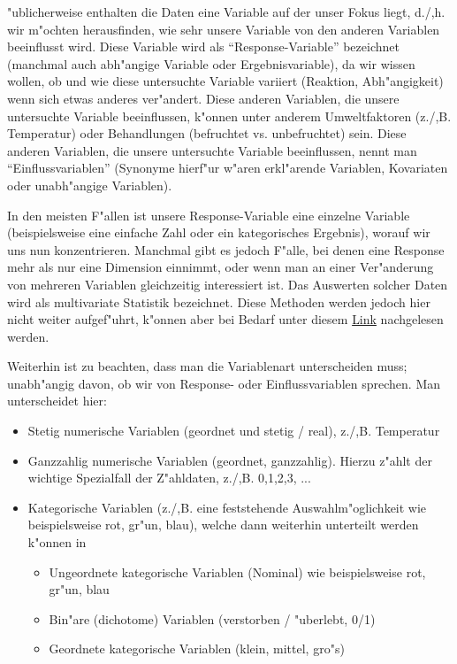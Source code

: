 \documentclass[a4paper,twoside]{tufte-book}\usepackage[]{graphicx}\usepackage[]{color}
\begin{document}
	"ublicherweise enthalten die Daten eine Variable auf der unser Fokus liegt, d./,h. wir m"ochten herausfinden, wie sehr unsere Variable von den anderen Variablen beeinflusst wird.   Diese Variable wird als ``Response-Variable'' bezeichnet (manchmal auch abh"angige Variable oder Ergebnisvariable), da wir wissen wollen, ob und wie diese untersuchte Variable variiert (Reaktion, Abh"angigkeit) wenn sich etwas anderes ver"andert. Diese anderen Variablen, die unsere untersuchte Variable beeinflussen, k"onnen unter anderem Umweltfaktoren (z./,B. Temperatur) oder Behandlungen (befruchtet vs. unbefruchtet) sein.  Diese anderen Variablen, die unsere untersuchte Variable beeinflussen, nennt man ``Einflussvariablen'' (Synonyme hierf"ur w"aren erkl"arende Variablen, Kovariaten oder unabh"angige Variablen). 
	
	In den  meisten F"allen ist unsere Response-Variable eine einzelne Variable (beispielsweise eine einfache Zahl oder ein kategorisches Ergebnis), worauf wir uns nun konzentrieren. Manchmal gibt es jedoch F"alle, bei denen eine Response mehr als nur eine Dimension einnimmt, oder wenn man an einer Ver"anderung von mehreren Variablen gleichzeitig interessiert ist. Das Auswerten solcher Daten wird als multivariate Statistik bezeichnet. Diese Methoden werden jedoch hier nicht weiter aufgef"uhrt, k"onnen aber bei Bedarf unter diesem \href{http://biometry.github.io/APES/Stats/stats50-MultivariateStatistics.html}{Link} nachgelesen werden.
	
	Weiterhin ist zu beachten, dass man die Variablenart unterscheiden muss; unabh"angig davon, ob wir von Response- oder Einflussvariablen sprechen. Man unterscheidet hier: 
	
	\begin{itemize}
		\item Stetig numerische Variablen (geordnet und stetig / real), z./,B. Temperatur
		\item Ganzzahlig numerische Variablen (geordnet, ganzzahlig). Hierzu z"ahlt der wichtige Spezialfall der Z"ahldaten, z./,B. 0,1,2,3, ...
		\item Kategorische Variablen (z./,B. eine feststehende Auswahlm"oglichkeit wie beispielsweise rot, gr"un, blau), welche dann weiterhin unterteilt werden k"onnen in 
		\begin{itemize}
			\item Ungeordnete kategorische Variablen (Nominal) wie beispielsweise rot, gr"un, blau
			\item Bin"are (dichotome) Variablen (verstorben / "uberlebt, 0/1)
			\item Geordnete kategorische Variablen (klein, mittel, gro"s)
		\end{itemize}
	\end{itemize}
	
\end{document}
